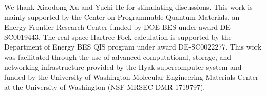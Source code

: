 \documentclass[twocolumn,aps,prl,superscriptaddress]{revtex4-2}
\begin{document}
\begin{acknowledgments}
We thank Xiaodong Xu and Yuchi He for stimulating discussions.  This work is mainly supported by the Center on Programmable Quantum Materials, an Energy Frontier Research Center funded by DOE BES under award DE-SC0019443.  The real-space Hartree-Fock calculation is supported by the Department of Energy BES QIS program under award DE-SC0022277.  This work was facilitated through the use of advanced computational, storage, and networking infrastructure provided by the Hyak supercomputer system and funded by the University of Washington Molecular Engineering Materials Center at the University of Washington (NSF MRSEC DMR-1719797).
\end{acknowledgments}




\end{document}
